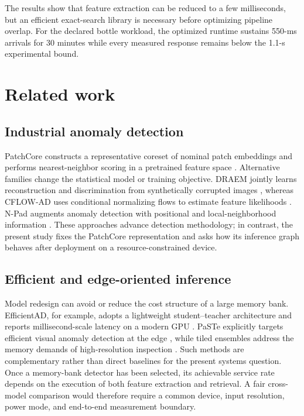 \documentclass[twocolumn]{svjour3}
\begin{document}
The results show that feature extraction can be reduced to a few milliseconds,
but an efficient exact-search library is necessary before optimizing pipeline
overlap. For the declared bottle workload, the optimized runtime sustains
550-ms arrivals for 30 minutes while every measured response remains below the
1.1-s experimental bound.

\section{Related work}\label{sec:related}
\subsection{Industrial anomaly detection}
PatchCore constructs a representative coreset of nominal patch embeddings and
performs nearest-neighbor scoring in a pretrained feature space
\cite{roth2022patchcore}. Alternative families change the statistical model or
training objective. DRAEM jointly learns reconstruction and discrimination
from synthetically corrupted images \cite{zavrtanik2021draem}, whereas CFLOW-AD
uses conditional normalizing flows to estimate feature likelihoods
\cite{gudovskiy2022cflow}. N-Pad augments anomaly detection with positional and
local-neighborhood information \cite{jang2023npad}. These approaches advance
detection methodology; in contrast, the present study fixes the PatchCore
representation and asks how its inference graph behaves after deployment on a
resource-constrained device.

\subsection{Efficient and edge-oriented inference}
Model redesign can avoid or reduce the cost structure of a large memory bank.
EfficientAD, for example, adopts a lightweight student--teacher architecture
and reports millisecond-scale latency on a modern GPU
\cite{batzner2024efficientad}. PaSTe explicitly targets efficient visual
anomaly detection at the edge \cite{barusco2025paste}, while tiled ensembles
address the memory demands of high-resolution inspection
\cite{rolih2024tiled}. Such methods are complementary rather than direct
baselines for the present systems question. Once a memory-bank detector has
been selected, its achievable service rate depends on the execution of both
feature extraction and retrieval. A fair cross-model comparison would
therefore require a common device, input resolution, power mode, and
end-to-end measurement boundary.
\end{document}
